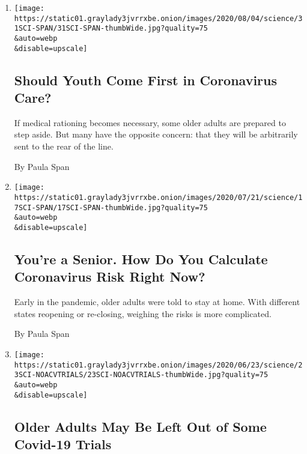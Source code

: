 \begin{enumerate}
\def\labelenumi{\arabic{enumi}.}
\item
  \href{/2020/07/31/health/coronavirus-ethics-rationing-elderly.html}{}

  \texttt{[image: https://static01.graylady3jvrrxbe.onion/images/2020/08/04/science/31SCI-SPAN/31SCI-SPAN-thumbWide.jpg?quality=75\\\&auto=webp\\\&disable=upscale]}

  \hypertarget{should-youth-come-first-in-coronavirus-care}{%
  \subsection{Should Youth Come First in Coronavirus
  Care?}\label{should-youth-come-first-in-coronavirus-care}}

  If medical rationing becomes necessary, some older adults are prepared
  to step aside. But many have the opposite concern: that they will be
  arbitrarily sent to the rear of the line.

  By Paula Span
\item
  \href{/2020/07/17/health/seniors-coronavirus-reopenings.html}{}

  \texttt{[image: https://static01.graylady3jvrrxbe.onion/images/2020/07/21/science/17SCI-SPAN/17SCI-SPAN-thumbWide.jpg?quality=75\\\&auto=webp\\\&disable=upscale]}

  \hypertarget{youre-a-senior-how-do-you-calculate-coronavirus-risk-right-now}{%
  \subsection{You're a Senior. How Do You Calculate Coronavirus Risk
  Right
  Now?}\label{youre-a-senior-how-do-you-calculate-coronavirus-risk-right-now}}

  Early in the pandemic, older adults were told to stay at home. With
  different states reopening or re-closing, weighing the risks is more
  complicated.

  By Paula Span
\item
  \href{/2020/06/19/health/vaccine-trials-elderly.html}{}

  \texttt{[image: https://static01.graylady3jvrrxbe.onion/images/2020/06/23/science/23SCI-NOACVTRIALS/23SCI-NOACVTRIALS-thumbWide.jpg?quality=75\\\&auto=webp\\\&disable=upscale]}

  \hypertarget{older-adults-may-be-left-out-of-some-covid-19-trials}{%
  \subsection{Older Adults May Be Left Out of Some Covid-19
  Trials}\label{older-adults-may-be-left-out-of-some-covid-19-trials}}


\end{enumerate}
